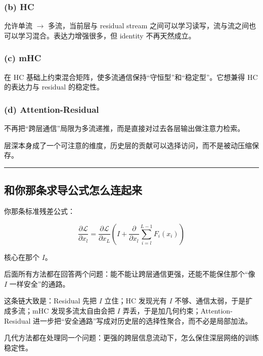 \subsubsection{(b) HC}

允许单流 \(\to\) 多流，当前层与 residual stream 之间可以学习读写，流与流之间也可以学习混合。表达力增强很多，但 identity 不再天然成立。

\subsubsection{(c) mHC}

在 HC 基础上约束混合矩阵，使多流通信保持“守恒型”和“稳定型”。它想兼得 HC 的表达力与 residual 的稳定性。

\subsubsection{(d) Attention-Residual}

不再把“跨层通信”局限为多流递推，而是直接对过去各层输出做注意力检索。

层深本身成了一个可注意的维度，历史层的贡献可以选择访问，而不是被动压缩保存。

\hrule

\subsection{和你那条求导公式怎么连起来}

你那条标准残差公式：

\[
\frac{\partial \mathcal L}{\partial x_l}
=
\frac{\partial \mathcal L}{\partial x_L}
\left(
I+
\frac{\partial}{\partial x_l}
\sum_{i=l}^{L-1}F_i(x_i)
\right)
\]

核心在那个 \(I\)。

后面所有方法都在回答两个问题：能不能让跨层通信更强，还能不能保住那个“像 \(I\) 一样安全”的通路。

这条链大致是：Residual 先把 \(I\) 立住；HC 发现光有 \(I\) 不够、通信太弱，于是扩成多流；mHC 发现多流太自由会把 \(I\) 弄丢，于是加几何约束；Attention-Residual 进一步把“安全通路”写成对历史层的选择性聚合，而不必是局部加法。

几代方法都在处理同一个问题：更强的跨层信息流动下，怎么保住深层网络的训练稳定性。
